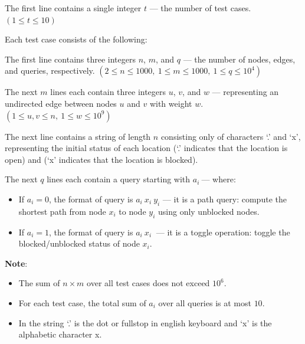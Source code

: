 The first line contains a single integer $t$ --- the number of test cases.
$(1 \le t \le 10)$

Each test case consists of the following:

The first line contains three integers $n$, $m$, and $q$ --- the number of nodes, edges, and queries, respectively.
$(2 \le n  \le 1000,\ 1 \le m \le 1000,\ 1 \le q \le 10^4)$

The next $m$ lines each contain three integers $u$, $v$, and $w$ --- representing an undirected edge between nodes $u$ and $v$ with weight $w$.
$(1 \le u, v \le n,\ 1 \le w \le 10^9)$

The next line contains a string of length $n$ consisting only of characters `.' and `x', representing the initial status of each location (`.' indicates that the location is open) and (`x' indicates that the location is blocked).

The next $q$ lines each contain a query starting with $a_i\ $--- where:

\begin{itemize}
\item If $a_i = 0$, the format of query is $a_i\ x_i\ y_i$ --- it is a path query: compute the shortest path from node $x_i$ to node $y_i$ using only unblocked nodes.

\item If $a_i = 1$, the format of query is $a_i\ x_i\ $ --- it is a toggle operation: toggle the blocked/unblocked status of node $x_i$. 
\end{itemize}

\textbf{Note}:
\begin{itemize}
\item The sum of $n \times m$ over all test cases does not exceed $10^6$.

\item For each test case, the total sum of $a_i$ over all queries is at most $10$.

\item In the string `.' is the dot or fullstop in english keyboard and `x' is the alphabetic character x.
\end{itemize}